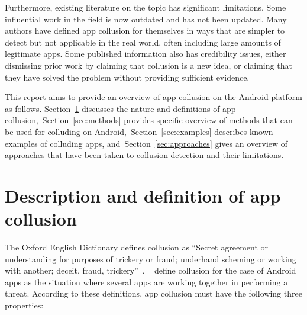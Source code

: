 \documentclass[article, oneside]{aaltoseries}
\newcommand{\Sref}[1]{Section~\ref{#1}}
\begin{document}
Furthermore, existing literature on the topic has significant limitations. Some influential work in the field is now outdated and has not been updated. Many authors have defined app collusion for themselves in ways that are simpler to detect but not applicable in the real world, often including large amounts of legitimate apps. Some published information also has credibility issues, either dismissing prior work by claiming that collusion is a new idea, or claiming that they have solved the problem without providing sufficient evidence.

This report aims to provide an overview of app collusion on the Android platform as follows. \Sref{sec:def} discusses the nature and definitions of app collusion,~\Sref{sec:methods} provides specific overview of methods that can be used for colluding on Android,~\Sref{sec:examples} describes known examples of colluding apps, and~\Sref{sec:approaches} gives an overview of approaches that have been taken to collusion detection and their limitations.

\section{Description and definition of app collusion}
\label{sec:def}

The Oxford English Dictionary defines collusion as ``Secret agreement or understanding for purposes of trickery or fraud; underhand scheming or working with another; deceit, fraud, trickery''~\cite{OEDcollusion}. \citeauthor{Asavoae2017}~\cite{Asavoae2017} define collusion for the case of Android apps as the situation where several apps are working together in performing a threat. According to these definitions, app collusion must have the following three properties:
\end{document}
